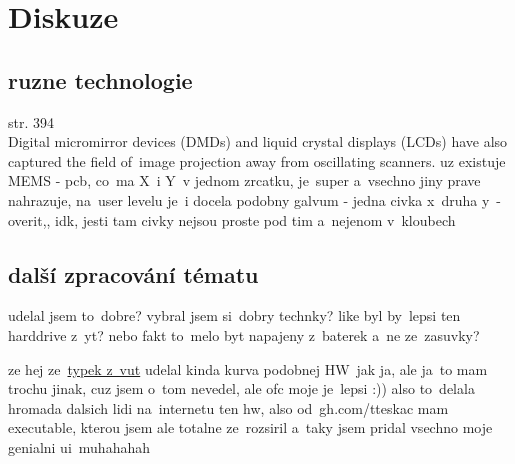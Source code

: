\chapter{Diskuze}
\section{ruzne technologie}
\cite{scanning-handbook} str. 394 \\
Digital micromirror devices (DMDs) and
liquid crystal displays (LCDs) have also captured the field of~image projection away from
oscillating scanners.
uz existuje MEMS - pcb, co~ma X~i Y~v jednom zrcatku, je~super a~vsechno jiny prave nahrazuje, na~user levelu je~i docela podobny galvum - jedna civka x~druha y~- overit,, idk, jesti tam civky nejsou proste pod tim a~nejenom v~kloubech



\section{další zpracování tématu}
udelal jsem to~dobre? vybral jsem si~dobry technky?
like byl by~lepsi ten harddrive z~yt?
nebo fakt to~melo byt napajeny z~baterek a~ne ze~zasuvky?

ze hej ze~\href{https://dspace.vutbr.cz/bitstream/handle/11012/38621/final-thesis.pdf?sequence=-1}{typek z~vut} udelal kinda kurva podobnej HW~jak ja, ale ja~to mam trochu jinak, cuz jsem o~tom nevedel, ale ofc moje je~lepsi :))
also to~delala hromada dalsich lidi na~internetu ten hw, also od~gh.com/tteskac mam executable, kterou jsem ale totalne ze~rozsiril a~taky jsem pridal vsechno moje genialni ui~muhahahah

